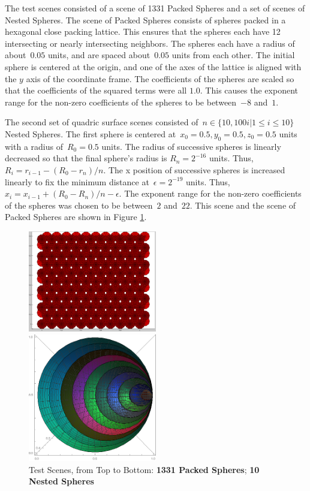 \documentclass{cccg16}
\begin{document}
The test scenes consisted of a scene of 1331 Packed Spheres and a set
of scenes of Nested Spheres.  The scene of Packed Spheres consists of
spheres packed in a hexagonal close packing lattice.  This ensures
that the spheres each have 12 intersecting or nearly intersecting
neighbors.  The spheres each have a radius of about~$0.05$ units, and
are spaced about~$0.05$ units from each other.  The initial sphere is
centered at the origin, and one of the axes of the lattice is aligned
with the $y$ axis of the coordinate frame.  The coefficients of the
spheres are scaled so that the coefficients of the squared terms were
all $1.0$. This causes the exponent range for the non-zero
coefficients of the spheres to be between~$-8$ and~$1$.

The second set of quadric surface scenes consisted of~$n\in\{10, 100i
| 1\leq i \leq 10\}$ Nested Spheres.  The first sphere is centered
at~$x_0=0.5, y_0=0.5, z_0=0.5$ units with a radius of~$R_0=0.5$ units.
The radius of successive spheres is linearly decreased so that the
final sphere's radius is $R_n=2^{-16}$ units.  Thus,
$R_i=r_{i-1}-(R_0-r_n)/n$.  The x position of successive spheres is
increased linearly to fix the minimum distance at~$\epsilon=2^{-19}$
units. Thus, $x_i=x_{i-1}+(R_0-R_n)/n-\epsilon$.  The exponent range
for the non-zero coefficients of the spheres was chosen to be
between~$2$ and~$22$.  This scene and the scene of Packed Spheres are
shown in Figure \ref{fig:testScenes}.

\begin{figure}
  \includegraphics[width=0.5\textwidth]{imgs/packedSpheres.png}
  \vspace{5mm}
  
  \includegraphics[width=0.5\textwidth]{imgs/hardEllipsoidsSingle.png}
  \caption{Test Scenes, from Top to Bottom:
    {\bf 1331 Packed Spheres};
    {\bf 10 Nested Spheres}}
  \label{fig:testScenes}
\end{figure}
\end{document}

